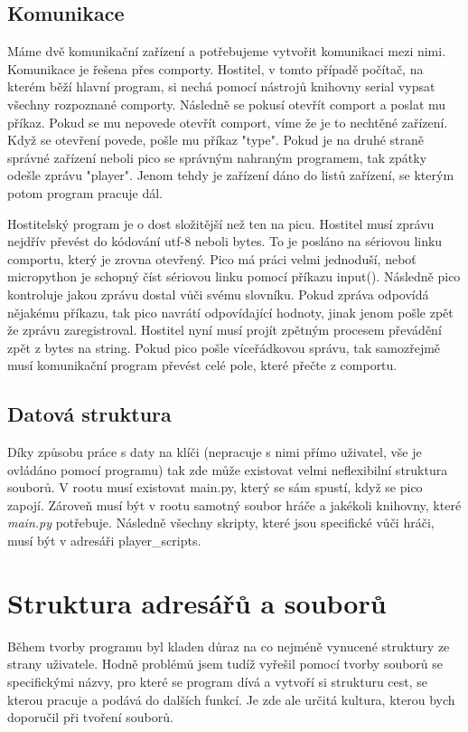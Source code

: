 \documentclass[12pt,a4paper]{article}
\begin{document}
\subsection{Komunikace}
Máme dvě komunikační zařízení a potřebujeme vytvořit komunikaci mezi nimi. Komunikace je řešena přes comporty. Hostitel, v tomto případě počítač, na kterém běží hlavní program, si nechá pomocí nástrojů knihovny serial vypsat všechny rozpoznané comporty. Následně se pokusí otevřít comport a poslat mu příkaz. Pokud se mu nepovede otevřít comport, víme že je to nechtěné zařízení. Když se otevření povede, pošle mu příkaz "type". Pokud je na druhé straně správné zařízení neboli pico se správným nahraným programem, tak zpátky odešle zprávu "player". Jenom tehdy je zařízení dáno do listů zařízení, se kterým potom program pracuje dál.

Hostitelský program je o dost složitější než ten na picu. Hostitel musí zprávu nejdřív převést do kódování utf-8 neboli bytes. To je posláno na sériovou linku comportu, který je zrovna otevřený. Pico má práci velmi jednoduší, neboť micropython je schopný číst sériovou linku pomocí příkazu input(). Následně pico kontroluje jakou zprávu dostal vůči svému slovníku. Pokud zpráva odpovídá nějakému příkazu, tak pico navrátí odpovídající hodnoty, jinak jenom pošle zpět že zprávu zaregistroval. Hostitel nyní musí projít zpětným procesem převádění zpět z bytes na string. Pokud pico pošle víceřádkovou správu, tak samozřejmě musí komunikační program převést celé pole, které přečte z comportu. 

\subsection{Datová struktura}
Díky způsobu práce s daty na klíči (nepracuje s nimi přímo uživatel, vše je ovládáno pomocí programu) tak zde může existovat velmi neflexibilní struktura souborů. V rootu musí existovat main.py, který se sám spustí, když se pico zapojí. Zároveň musí být v rootu samotný soubor hráče a jakékoli knihovny, které \textit{main.py} potřebuje. Následně všechny skripty, které jsou specifické vůči hráči, musí být v adresáři player\_scripts.

\newpage
\section{Struktura adresářů a souborů}
Během tvorby programu byl kladen důraz na co nejméně vynucené struktury ze strany uživatele. Hodně problémů jsem tudíž vyřešil pomocí tvorby souborů se specifickými názvy, pro které se program dívá a vytvoří si strukturu cest, se kterou pracuje a podává do dalších funkcí. Je zde ale určitá kultura, kterou bych doporučil při tvoření souborů.
\end{document}
